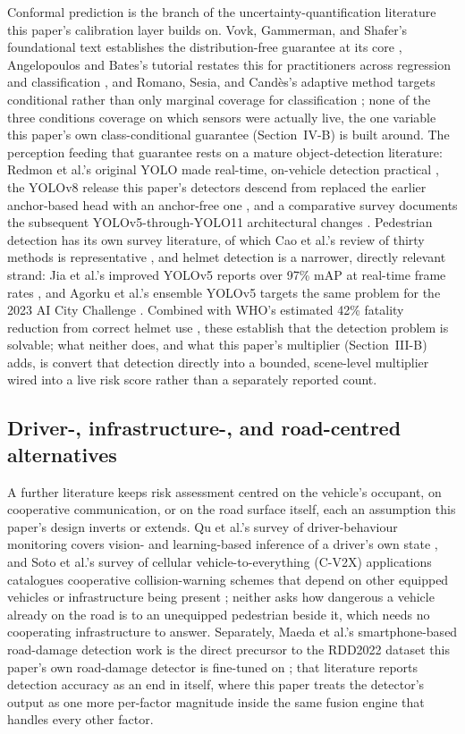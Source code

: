 \documentclass[journal]{IEEEtran}
\begin{document}
Conformal prediction is the branch of the uncertainty-quantification literature this paper's calibration layer builds on. Vovk, Gammerman, and Shafer's foundational text establishes the distribution-free guarantee at its core \cite{vovk2022}, Angelopoulos and Bates's tutorial restates this for practitioners across regression and classification \cite{angelopoulos2023}, and Romano, Sesia, and Cand\`es's adaptive method targets conditional rather than only marginal coverage for classification \cite{romano2020}; none of the three conditions coverage on which sensors were actually live, the one variable this paper's own class-conditional guarantee (Section~IV-B) is built around. The perception feeding that guarantee rests on a mature object-detection literature: Redmon et al.'s original YOLO made real-time, on-vehicle detection practical \cite{redmon2016}, the YOLOv8 release this paper's detectors descend from replaced the earlier anchor-based head with an anchor-free one \cite{jocher2023}, and a comparative survey documents the subsequent YOLOv5-through-YOLO11 architectural changes \cite{sapkota2025}. Pedestrian detection has its own survey literature, of which Cao et al.'s review of thirty methods is representative \cite{cao2022}, and helmet detection is a narrower, directly relevant strand: Jia et al.'s improved YOLOv5 reports over 97\% mAP at real-time frame rates \cite{jia2021}, and Agorku et al.'s ensemble YOLOv5 targets the same problem for the 2023 AI City Challenge \cite{agorku2023}. Combined with WHO's estimated 42\% fatality reduction from correct helmet use \cite{who2006}, these establish that the detection problem is solvable; what neither does, and what this paper's multiplier (Section~III-B) adds, is convert that detection directly into a bounded, scene-level multiplier wired into a live risk score rather than a separately reported count.

\subsection{Driver-, infrastructure-, and road-centred alternatives}

A further literature keeps risk assessment centred on the vehicle's occupant, on cooperative communication, or on the road surface itself, each an assumption this paper's design inverts or extends. Qu et al.'s survey of driver-behaviour monitoring covers vision- and learning-based inference of a driver's own state \cite{qu2024}, and Soto et al.'s survey of cellular vehicle-to-everything (C-V2X) applications catalogues cooperative collision-warning schemes that depend on other equipped vehicles or infrastructure being present \cite{soto2022}; neither asks how dangerous a vehicle already on the road is to an unequipped pedestrian beside it, which needs no cooperating infrastructure to answer. Separately, Maeda et al.'s smartphone-based road-damage detection work \cite{maeda2018} is the direct precursor to the RDD2022 dataset this paper's own road-damage detector is fine-tuned on \cite{arya2024}; that literature reports detection accuracy as an end in itself, where this paper treats the detector's output as one more per-factor magnitude inside the same fusion engine that handles every other factor.
\end{document}
